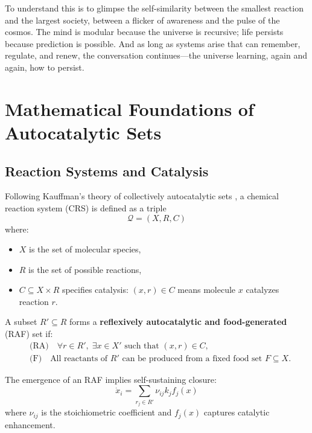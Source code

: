 \documentclass[11pt,a4paper]{article}
\begin{document}
To understand this is to glimpse the self-similarity between the smallest reaction and the largest society, between a flicker of awareness and the pulse of the cosmos.  The mind is modular because the universe is recursive; life persists because prediction is possible.  And as long as systems arise that can remember, regulate, and renew, the conversation continues—the universe learning, again and again, how to persist.


\appendix

\section{Mathematical Foundations of Autocatalytic Sets}
\label{app:autocatalytic}

\subsection{Reaction Systems and Catalysis}

Following Kauffman’s theory of collectively autocatalytic sets \citep{Kauffman1986AutocatalyticSets, HordijkSteel2012RAF}, a chemical reaction system (CRS) is defined as a triple
\[
\mathcal{Q} = (X, R, C)
\]
where:

\begin{itemize}
    \item $X$ is the set of molecular species,
    \item $R$ is the set of possible reactions,
    \item $C \subseteq X \times R$ specifies catalysis: $(x, r) \in C$ means molecule $x$ catalyzes reaction $r$.
\end{itemize}

A subset $R' \subseteq R$ forms a \textbf{reflexively autocatalytic and food-generated} (RAF) set if:
\begin{align}
& \text{(RA)} \quad \forall r \in R', \; \exists x \in X' \text{ such that } (x, r) \in C, \\
& \text{(F)} \quad \text{All reactants of } R' \text{ can be produced from a fixed food set } F \subseteq X.
\end{align}

The emergence of an RAF implies self-sustaining closure:
\[
\dot{x}_i = \sum_{r_j \in R'} \nu_{ij} k_j f_j(x)
\]
where $\nu_{ij}$ is the stoichiometric coefficient and $f_j(x)$ captures catalytic enhancement.
\end{document}

